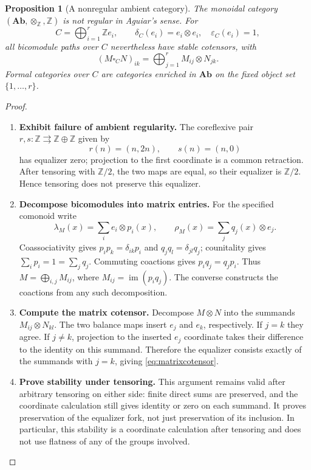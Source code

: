 \documentclass[11pt,reqno]{amsart}
\theoremstyle{plain}
\newtheorem{proposition}[theorem]{Proposition}
\theoremstyle{definition}
\theoremstyle{remark}
\numberwithin{equation}{section}
\newcommand{\Ab}{\mathbf{Ab}}
\newcommand{\eps}{\varepsilon}
\begin{document}
\begin{proposition}[A nonregular ambient category]\label{prop:Ab}
The monoidal category $(\Ab,\otimes_{\mathbb Z},\mathbb Z)$ is not
regular in Aguiar's sense. For
\[
 C=\bigoplus_{i=1}^{r}\mathbb Z e_i,\qquad
 \delta_C(e_i)=e_i\otimes e_i,\quad \eps_C(e_i)=1,
\]
all bicomodule paths over $C$ nevertheless have stable cotensors, with
\begin{equation}\label{eq:matrixcotensor}
 (M\square_C N)_{ik}=\bigoplus_{j=1}^{r}M_{ij}\otimes N_{jk}.
\end{equation}
Formal categories over $C$ are categories enriched in $\Ab$ on the
fixed object set $\{1,\ldots,r\}$.
\end{proposition}
\begin{proof}\leavevmode
\begin{enumerate}
\item \textbf{Exhibit failure of ambient regularity.} The coreflexive pair $r,s:\mathbb Z\rightrightarrows\mathbb Z\oplus
\mathbb Z$ given by
\[
 r(n)=(n,2n),\qquad s(n)=(n,0)
\]
has equalizer zero; projection to the first coordinate is a common
retraction. After tensoring with $\mathbb Z/2$, the two maps are
equal, so their equalizer is $\mathbb Z/2$. Hence tensoring does not
preserve this equalizer.

\item \textbf{Decompose bicomodules into matrix entries.} For the specified comonoid write
\[
 \lambda_M(x)=\sum_i e_i\otimes p_i(x),\qquad
 \rho_M(x)=\sum_j q_j(x)\otimes e_j.
\]
Coassociativity gives $p_ip_k=\delta_{ik}p_i$ and
$q_jq_l=\delta_{jl}q_j$; counitality gives
$\sum_i p_i=1=\sum_j q_j$. Commuting coactions gives
$p_iq_j=q_jp_i$. Thus
$M=\bigoplus_{i,j}M_{ij}$, where $M_{ij}=\operatorname{im}(p_iq_j)$.
The converse constructs the coactions from any such decomposition.

\item \textbf{Compute the matrix cotensor.} Decompose $M\otimes N$ into the summands
$M_{ij}\otimes N_{kl}$. The two balance maps insert $e_j$ and
$e_k$, respectively. If $j=k$ they agree. If $j\ne k$, projection
to the inserted $e_j$ coordinate takes their difference to the
identity on this summand. Therefore the equalizer consists exactly
of the summands with $j=k$, giving \cref{eq:matrixcotensor}.

\item \textbf{Prove stability under tensoring.} This argument remains valid after arbitrary tensoring on either side:
finite direct sums are preserved, and the coordinate calculation still
gives identity or zero on each summand. It proves preservation of the
equalizer fork, not just preservation of its inclusion. In particular, this
stability is a coordinate calculation after tensoring and does not use
flatness of any of the groups involved.


\end{enumerate}
\end{proof}
\end{document}
